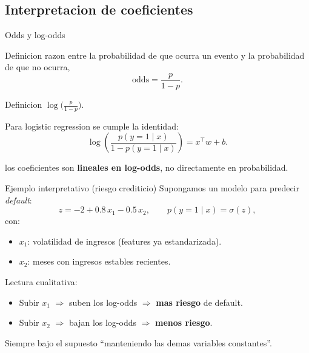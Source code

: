 \subsection{Interpretacion de coeficientes}

\begin{frame}{Odds y log-odds}
\begin{block}{Definicion}
\small
{} razon entre la probabilidad de que ocurra un evento y la probabilidad de que no ocurra,
\[
\text{odds} = \frac{p}{1-p}.
\]
\end{block}

\begin{block}{Definicion}
\small
{} $\log\!\big(\tfrac{p}{1-p}\big)$.
\end{block}

\vspace{0.25em}
Para logistic regression se cumple la identidad:
\[
\log\!\left(\frac{p(y=1\mid x)}{1-p(y=1\mid x)}\right) = x^\top w + b.
\]

\vspace{0.25em}
 los coeficientes son \textbf{lineales en log-odds}, no directamente en probabilidad.
\end{frame}

\begin{frame}{Ejemplo interpretativo (riesgo crediticio)}
Supongamos un modelo para predecir \emph{default}:
\[
z = -2 + 0.8\,x_1 - 0.5\,x_2,
\qquad
p(y=1\mid x) = \sigma(z),
\]
con:
\begin{itemize}\small
  \item $x_1$: volatilidad de ingresos (features ya estandarizada).
  \item $x_2$: meses con ingresos estables recientes.
\end{itemize}

\vspace{0.25em}
Lectura cualitativa:
\begin{itemize}\small
  \item Subir $x_1$ $\Rightarrow$ suben los log-odds $\Rightarrow$ \textbf{mas riesgo} de default.
  \item Subir $x_2$ $\Rightarrow$ bajan los log-odds $\Rightarrow$ \textbf{menos riesgo}.
\end{itemize}

\vspace{0.25em}
{\footnotesize Siempre bajo el supuesto ``manteniendo las demas variables constantes''.}
\end{frame}

